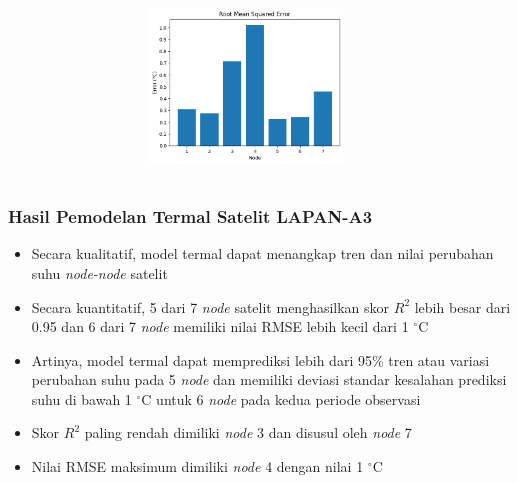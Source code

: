\documentclass[8pt]{beamer}
\begin{document}
\begin{frame}
\begin{columns}[T]
\begin{figure}
      \end{figure}
      \begin{figure}
          \includegraphics[width=0.6\textwidth]{figure/rmse_2018-05-20.png}
      \end{figure}
  \end{columns}
\end{frame}
\begin{frame}
  \frametitle{Hasil Pemodelan Termal Satelit LAPAN-A3}
  \begin{itemize}
    \item Secara kualitatif, model termal dapat menangkap tren dan nilai perubahan suhu \textit{node-node} satelit
    \item Secara kuantitatif, 5 dari 7 \textit{node} satelit menghasilkan skor $R^2$ lebih besar dari 0.95 dan 6 dari 7 \textit{node} memiliki nilai RMSE lebih kecil dari 1 $^\circ$C
    \item Artinya, model termal dapat memprediksi lebih dari 95\% tren atau variasi perubahan suhu pada 5 \textit{node} dan memiliki deviasi standar kesalahan prediksi suhu di bawah 1 $^\circ$C untuk 6 \textit{node} pada kedua periode observasi
    \item Skor $R^2$ paling rendah dimiliki \textit{node} 3 dan disusul oleh \textit{node} 7
    \item Nilai RMSE maksimum dimiliki \textit{node} 4 dengan nilai 1 $^\circ$C
  \end{itemize}
\end{frame}
\end{document}

